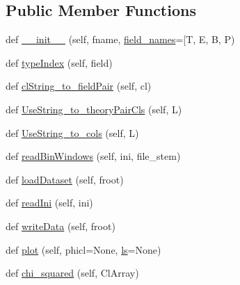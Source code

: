 \subsection*{Public Member Functions}
\begin{DoxyCompactItemize}
\item 
def \mbox{\hyperlink{classCMBlikes_1_1DatasetLikelihood_a441c826d7b251b0b8c4952227a50ec32}{\+\_\+\+\_\+init\+\_\+\+\_\+}} (self, fname, \mbox{\hyperlink{classCMBlikes_1_1DatasetLikelihood_ac40644fe79fe55208cfdd5bcbdbc16b0}{field\+\_\+names}}=\mbox{[}\textquotesingle{}T\textquotesingle{}, E, B, P)
\item 
def \mbox{\hyperlink{classCMBlikes_1_1DatasetLikelihood_a219f6f7bb9eaa9b79491321f93714cc9}{type\+Index}} (self, field)
\item 
def \mbox{\hyperlink{classCMBlikes_1_1DatasetLikelihood_a1c4319df1f3bee812339356d08d11266}{cl\+String\+\_\+to\+\_\+field\+Pair}} (self, cl)
\item 
def \mbox{\hyperlink{classCMBlikes_1_1DatasetLikelihood_a041f75367c5d576ee721138a8c979152}{Use\+String\+\_\+to\+\_\+theory\+Pair\+Cls}} (self, L)
\item 
def \mbox{\hyperlink{classCMBlikes_1_1DatasetLikelihood_a5e9c351429d38145bb855c6cae9aa8a9}{Use\+String\+\_\+to\+\_\+cols}} (self, L)
\item 
def \mbox{\hyperlink{classCMBlikes_1_1DatasetLikelihood_a0be6ad34af94442ef5f81038b4691a40}{read\+Bin\+Windows}} (self, ini, file\+\_\+stem)
\item 
def \mbox{\hyperlink{classCMBlikes_1_1DatasetLikelihood_a937aff0ad89355d32c9d5fe9bda150f8}{load\+Dataset}} (self, froot)
\item 
def \mbox{\hyperlink{classCMBlikes_1_1DatasetLikelihood_adb3126cf73eb96c8f6b877dc4a44e297}{read\+Ini}} (self, ini)
\item 
def \mbox{\hyperlink{classCMBlikes_1_1DatasetLikelihood_a4947f366e34f12e16f502b68dea4632f}{write\+Data}} (self, froot)
\item 
def \mbox{\hyperlink{classCMBlikes_1_1DatasetLikelihood_a66d6d09de55272b7cfdad9c4715f196a}{plot}} (self, phicl=None, \mbox{\hyperlink{plotTT_8m_aac1113e50f7f1460beeaeeba69f63701}{ls}}=None)
\item 
def \mbox{\hyperlink{classCMBlikes_1_1DatasetLikelihood_a344ec47a2697348cbfa42a047e426baa}{chi\+\_\+squared}} (self, Cl\+Array)
\end{DoxyCompactItemize}
